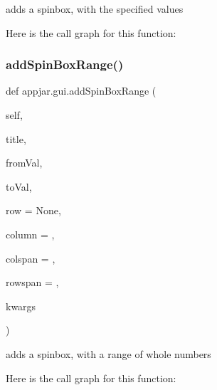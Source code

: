 \begin{DoxyVerb}adds a spinbox, with the specified values \end{DoxyVerb}
 Here is the call graph for this function\+:
\mbox{\label{classappjar_1_1gui_a315791f6959af7a09c481e2526956efa}} 
\subsubsection{\texorpdfstring{add\+Spin\+Box\+Range()}{addSpinBoxRange()}}
{\footnotesize\ttfamily def appjar.\+gui.\+add\+Spin\+Box\+Range (\begin{DoxyParamCaption}\item[{}]{self,  }\item[{}]{title,  }\item[{}]{from\+Val,  }\item[{}]{to\+Val,  }\item[{}]{row = {\ttfamily None},  }\item[{}]{column = {},  }\item[{}]{colspan = {},  }\item[{}]{rowspan = {},  }\item[{}]{kwargs }\end{DoxyParamCaption})}

\begin{DoxyVerb}adds a spinbox, with a range of whole numbers \end{DoxyVerb}
 Here is the call graph for this function\+:
\mbox{\label{classappjar_1_1gui_a35b300980afd1ca2cb3b5f6396160459}} 
